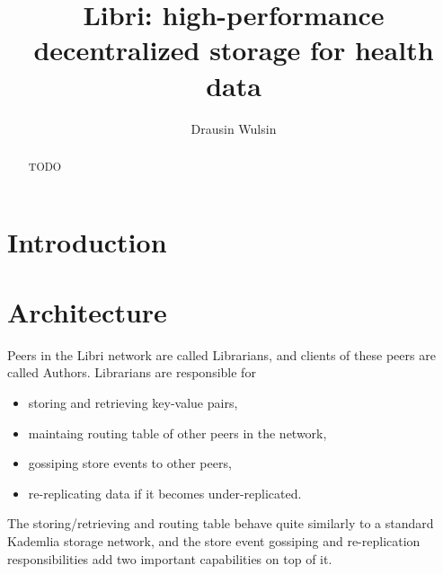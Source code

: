 \documentclass[10pt]{article}
\begin{document}
\title{Libri: high-performance decentralized storage for health data}
\author{Drausin Wulsin}
\maketitle

\begin{abstract}
TODO
\end{abstract}

\section{Introduction}

\section{Architecture}

Peers in the Libri network are called Librarians, and clients of these peers are called Authors. Librarians are responsible for 
\begin{itemize}
	\item storing and retrieving key-value pairs,
	\item maintaing routing table of other peers in the network,
	\item gossiping store events to other peers,
	\item re-replicating data if it becomes under-replicated.
\end{itemize}
The storing/retrieving and routing table behave quite similarly to a standard Kademlia storage network, and the store event gossiping and re-replication responsibilities add two important capabilities on top of it. 
\end{document}
